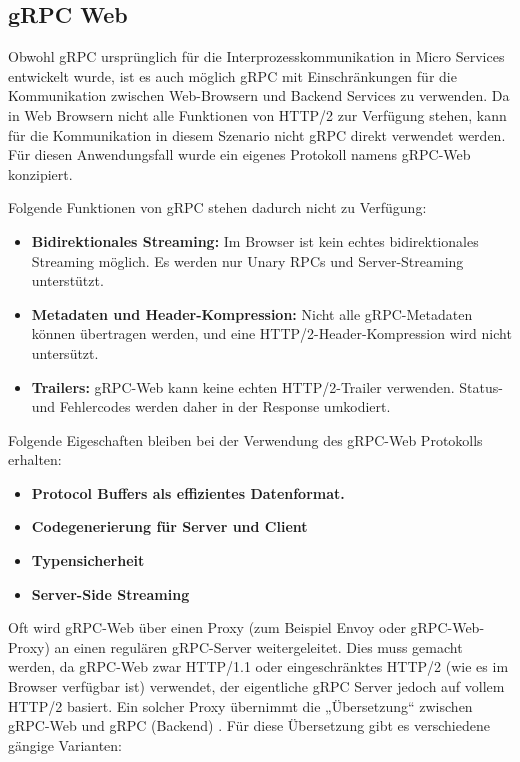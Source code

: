 \clearpage
\subsection{gRPC Web}
Obwohl gRPC ursprünglich für die Interprozesskommunikation in Micro Services entwickelt wurde, ist es auch möglich gRPC mit Einschränkungen für die Kommunikation zwischen Web-Browsern und Backend Services zu verwenden.
Da in Web Browsern nicht alle Funktionen von HTTP/2 zur Verfügung stehen, kann für die Kommunikation in diesem Szenario nicht gRPC direkt verwendet werden. Für diesen Anwendungsfall wurde ein eigenes Protokoll namens gRPC-Web konzipiert. 
 

Folgende Funktionen von gRPC stehen dadurch nicht zu Verfügung:

\begin{itemize}
	\item \textbf{Bidirektionales Streaming:} 
	Im Browser ist kein echtes bidirektionales Streaming möglich. 
	Es werden nur Unary RPCs und Server-Streaming unterstützt.
	
	\item \textbf{Metadaten und Header-Kompression:} 
	Nicht alle gRPC-Metadaten können übertragen werden, und eine HTTP/2-Header-Kompression wird nicht untersützt.
	
	\item \textbf{Trailers:} 
	gRPC-Web kann keine echten HTTP/2-Trailer verwenden. 
	Status- und Fehlercodes werden daher in der Response umkodiert.
\end{itemize}

Folgende Eigeschaften bleiben bei der Verwendung des gRPC-Web Protokolls erhalten:

\begin{itemize}
	\item \textbf{Protocol Buffers als effizientes Datenformat.} 
	\item \textbf{Codegenerierung für Server und Client} 
	\item \textbf{Typensicherheit}
	\item \textbf{Server-Side Streaming} 	
\end{itemize}



Oft wird gRPC-Web über einen Proxy (zum Beispiel Envoy oder gRPC-Web-Proxy) an einen regulären gRPC-Server weitergeleitet. Dies muss gemacht werden, da gRPC-Web zwar HTTP/1.1 oder eingeschränktes HTTP/2 (wie es im Browser verfügbar ist) verwendet, der eigentliche gRPC Server jedoch auf vollem HTTP/2 basiert. Ein solcher Proxy übernimmt die „Übersetzung“ zwischen gRPC-Web und gRPC (Backend) \parencite{Brandhorst2019}. Für diese Übersetzung gibt es verschiedene gängige Varianten:

